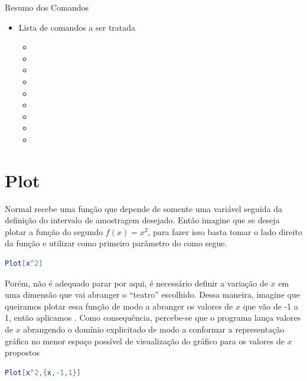 \documentclass[a4paper, 12pt]{article}
\begin{document}
	\begin{center}
		\begin{huge}
			Resumo dos Comandos
		\end{huge}
	\end{center}

	\begin{itemize}
		\item Lista de comandos a ser tratada
		\begin{itemize}
			\item{}
			\item{}
			\item{}
			\item{}
			\item {}
			\item{}
			\item{}
			\item{}
			\item{}
		\end{itemize}
	\end{itemize}

	\section{Plot}
	Normal recebe uma função que depende de somente uma variável seguida da definição do intervalo de amostragem desejado. Então imagine que se deseja plotar a função do segundo $f(x)=x^{2}$, para fazer isso basta tomar o lado direito da função e utilizar como primeiro parâmetro do  como segue.	

	\begin{lstlisting}[language=Mathematica]
	Plot[x^2]
	\end{lstlisting}
	
	Porém, não é adequado parar por aqui, é necessário definir a variação de $x$ em uma dimensão que vai abranger o ``teatro'' escolhido. Dessa maneira, imagine que queiramos plotar essa função de modo a abranger os valores de $x$ que vão de -1 a 1, então aplicamos . Como consequência, percebe-se que o programa lança valores de $x$ abrangendo o domínio explicitado de modo a conformar a representação gráfica no menor espaço possível de visualização do gráfico para os valores de $x$ propostos
	
	\begin{lstlisting}[language=Mathematica]
	Plot[x^2,{x,-1,1}]
	\end{lstlisting}
	
\end{document}
